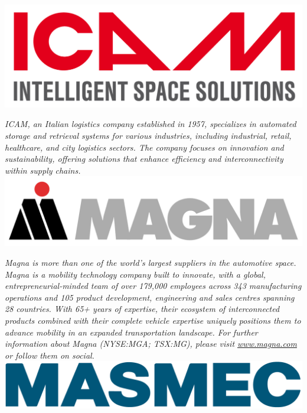 \documentclass[
	openany, %
	parskip=full, %
	12pt, %
	a4paper, %
]{conferencebooklet} %
\begin{document}
\begin{multicols*}{2}
    \hfill\includegraphics[width=\sponsorscaling\linewidth]{logos/icam.jpg}\hspace*{\fill}

    \textit{ICAM, an Italian logistics company established in 1957, specializes in automated storage and retrieval systems for various industries, including industrial, retail, healthcare, and city logistics sectors. The company focuses on innovation and sustainability, offering solutions that enhance efficiency and interconnectivity within supply chains.} \\

    \hfill\includegraphics[width=\sponsorscaling\linewidth]{logos/magna.png}\hspace*{\fill}
    
    \textit{Magna is more than one of the world’s largest suppliers in the automotive space. Magna is a mobility technology company built to innovate, with a global, entrepreneurial-minded team of over 179,000 employees across 343 manufacturing operations and 105 product development, engineering and sales centres spanning 28 countries. With 65+ years of expertise, their ecosystem of interconnected products combined with their complete vehicle expertise uniquely positions them to advance mobility in an expanded transportation landscape. For further information about Magna (NYSE:MGA; TSX:MG), please visit \url{www.magna.com} or follow them on social.} \\

    \hfill\includegraphics[width=\sponsorscaling\linewidth]{logos/masmec.png}\hspace*{\fill}
    

\end{multicols*}
\end{document}
